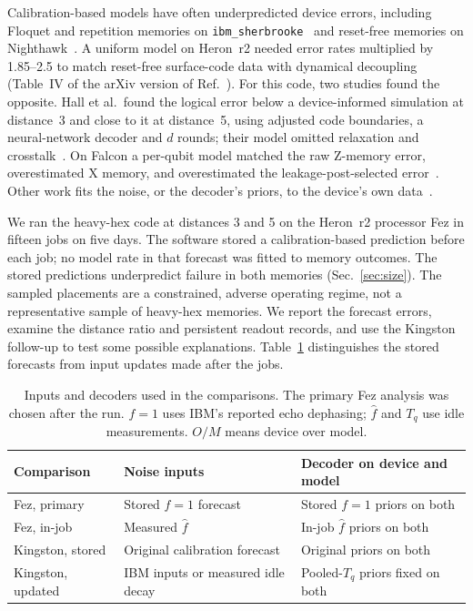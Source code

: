 \documentclass[aps,pra,reprint,nofootinbib,longbibliography,floatfix,showkeys]{revtex4-2}
\newcommand{\fhat}{\hat f}
\begin{document}
Calibration-based models have often underpredicted device errors, including Floquet and repetition memories on \texttt{ibm\_sherbrooke}~\cite{hesner2025using,hanisch2026soft} and reset-free memories on Nighthawk~\cite{drouet2026error,kim2026luci}.
A uniform model on Heron~r2 needed error rates multiplied by 1.85--2.5 to match reset-free surface-code data with dynamical decoupling (Table~IV of the arXiv version of Ref.~\cite{vezvaee2026surface}).
For this code, two studies found the opposite.
Hall et al.\ found the logical error below a device-informed simulation at distance~3 and close to it at distance~5, using adjusted code boundaries, a neural-network decoder and $d$ rounds; their model omitted relaxation and crosstalk~\cite{hall2024artificial}.
On Falcon a per-qubit model matched the raw Z-memory error, overestimated X memory, and overestimated the leakage-post-selected error~\cite{sundaresan2023demonstrating}.
Other work fits the noise, or the decoder's priors, to the device's own data~\cite{hesner2025using,harper2026characterising,hockings2025scalable,lee2026scalable,google2021exponential,chen2022calibrated,takou2026logical,sivak2024optimization}.

We ran the heavy-hex code at distances 3 and 5 on the Heron~r2 processor Fez in fifteen jobs on five days.
The software stored a calibration-based prediction before each job; no model rate in that forecast was fitted to memory outcomes.
The stored predictions underpredict failure in both memories (Sec.~\ref{sec:size}).
The sampled placements are a constrained, adverse operating regime, not a representative sample of heavy-hex memories.
We report the forecast errors, examine the distance ratio and persistent readout records, and use the Kingston follow-up to test some possible explanations.
Table~\ref{tab:stages} distinguishes the stored forecasts from input updates made after the jobs.

\begin{table}[tb]
\caption{Inputs and decoders used in the comparisons. The primary Fez analysis was chosen after the run. $f=1$ uses IBM's reported echo dephasing; $\fhat$ and $T_q$ use idle measurements. $O/M$ means device over model.}
\label{tab:stages}
\footnotesize
\setlength{\tabcolsep}{3pt}
\begin{ruledtabular}
\begin{tabular}{@{}p{}p{}p{}@{}}
Comparison & Noise inputs & Decoder on device and model \\
\hline
Fez, primary & Stored $f=1$ forecast & Stored $f=1$ priors on both \\
Fez, in-job & Measured $\fhat$ & In-job $\fhat$ priors on both \\
Kingston, stored & Original calibration forecast & Original priors on both \\
Kingston, updated & IBM inputs or measured idle decay & Pooled-$T_q$ priors fixed on both \\
\end{tabular}
\end{ruledtabular}
\end{table}
\end{document}
